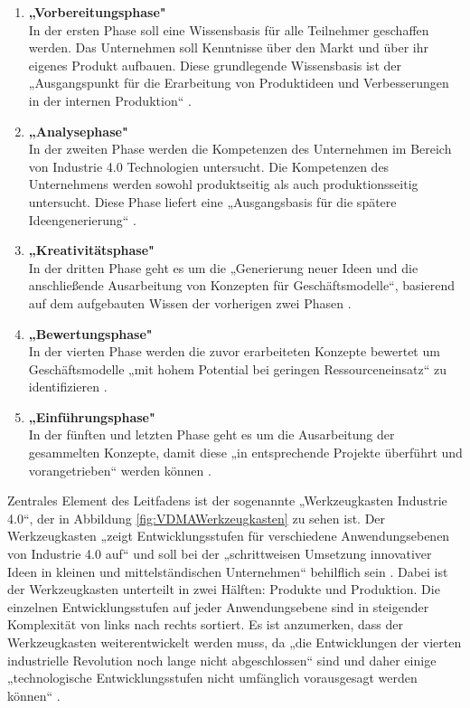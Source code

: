 \begin{enumerate}
	\item \textbf{„Vorbereitungsphase"} \cite[S.10]{2} \\ In der ersten Phase soll eine Wissensbasis für alle Teilnehmer geschaffen werden. Das Unternehmen soll Kenntnisse über den Markt und über ihr eigenes Produkt aufbauen. Diese grundlegende Wissensbasis ist der „Ausgangspunkt für die Erarbeitung von Produktideen und Verbesserungen in der internen Produktion“ \cite[S.10]{2}.
	\item \textbf{„Analysephase"} \cite[S.10]{2} \\ In der zweiten Phase werden die Kompetenzen des Unternehmen im Bereich von Industrie 4.0 Technologien untersucht. Die Kompetenzen des Unternehmens werden sowohl produktseitig als auch produktionsseitig untersucht. Diese Phase liefert eine „Ausgangsbasis für die spätere Ideengenerierung“ \cite[S.10]{2}.
	\item \textbf{„Kreativitätsphase"} \cite[S.10]{2} \\ In der dritten Phase geht es um die „Generierung neuer Ideen und die anschließende Ausarbeitung von Konzepten für Geschäftsmodelle“\cite[S.10]{2}, basierend auf dem aufgebauten Wissen der vorherigen zwei Phasen \cite[S.10]{2}.
	\item \textbf{„Bewertungsphase"} \cite[S.10]{2} \\ In der vierten Phase werden die zuvor erarbeiteten Konzepte bewertet um Geschäftsmodelle „mit hohem Potential bei geringen Ressourceneinsatz“ \cite[S.10]{2} zu identifizieren \cite[S.10]{2}.
	\item \textbf{„Einführungsphase"} \cite[S.10]{2} \\ In der fünften und letzten Phase geht es um die Ausarbeitung der gesammelten Konzepte, damit diese „in entsprechende Projekte überführt und vorangetrieben“ \cite[S.10]{2} werden können \cite[S.10]{2}.
\end{enumerate}
Zentrales Element des Leitfadens ist der sogenannte „Werkzeugkasten Industrie 4.0“, der in  Abbildung \ref{fig:VDMAWerkzeugkasten} zu sehen ist. Der Werkzeugkasten „zeigt Entwicklungsstufen für verschiedene Anwendungsebenen von Industrie 4.0 auf“ \cite[S.11]{2} und soll bei der „schrittweisen Umsetzung innovativer Ideen in kleinen und mittelständischen Unternehmen“ behilflich sein \cite[S.11]{2}. Dabei ist der Werkzeugkasten unterteilt in zwei Hälften: Produkte und Produktion. Die einzelnen Entwicklungsstufen auf jeder Anwendungsebene sind in steigender Komplexität von links nach rechts sortiert. Es ist anzumerken, dass der Werkzeugkasten weiterentwickelt werden muss, da „die Entwicklungen der vierten industrielle Revolution noch lange nicht abgeschlossen“ \cite[S.11]{2} sind und daher einige „technologische Entwicklungsstufen nicht umfänglich vorausgesagt werden können“ \cite[S.11]{2}.
